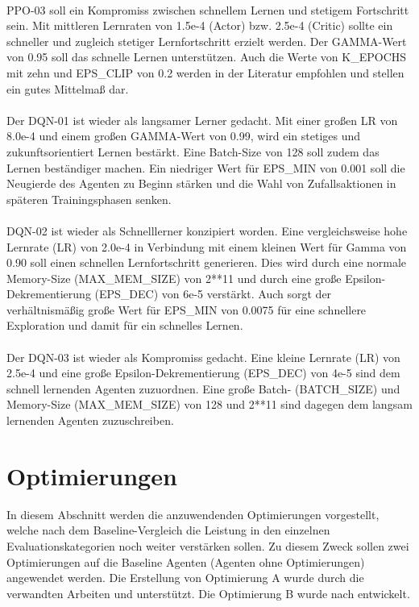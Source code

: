 \\PPO-03 soll ein Kompromiss zwischen schnellem Lernen und stetigem Fortschritt sein. Mit mittleren Lernraten von 1.5e-4 (Actor) bzw. 2.5e-4 (Critic) sollte ein schneller und zugleich stetiger Lernfortschritt erzielt werden. Der GAMMA-Wert von 0.95 soll das schnelle Lernen unterstützen. Auch die Werte von K\_EPOCHS mit zehn und EPS\_CLIP von 0.2 werden in der Literatur \cite[Anhang A]{PPO} empfohlen und stellen ein gutes Mittelmaß dar.\\
\\Der DQN-01 ist wieder als langsamer Lerner gedacht. Mit einer großen LR von 8.0e-4 und einem großen GAMMA-Wert von 0.99, wird ein stetiges und zukunftsorientiert Lernen bestärkt. Eine Batch-Size von 128 soll zudem das Lernen beständiger machen. Ein niedriger Wert für EPS\_MIN von 0.001 soll die Neugierde des Agenten zu Beginn stärken und die Wahl von Zufallsaktionen in späteren Trainingsphasen senken.\\
\\DQN-02 ist wieder als Schnelllerner konzipiert worden. Eine vergleichsweise hohe Lernrate (LR) von 2.0e-4 in Verbindung mit einem kleinen Wert für Gamma von 0.90 soll einen schnellen Lernfortschritt generieren. Dies wird durch eine normale Memory-Size (MAX\_MEM\_SIZE) von 2**11 und durch eine große Epsilon-Dekrementierung (EPS\_DEC) von 6e-5 verstärkt. Auch sorgt der verhältnismäßig große Wert für EPS\_MIN von 0.0075 für eine schnellere Exploration und damit für ein schnelles Lernen.\\
\\Der DQN-03 ist wieder als Kompromiss gedacht. Eine kleine Lernrate (LR) von \linebreak[4] 2.5e-4 und eine große Epsilon-Dekrementierung (EPS\_DEC) von 4e-5 sind dem schnell lernenden Agenten zuzuordnen. Eine große Batch- (BATCH\_SIZE) und Memory-Size (MAX\_MEM\_SIZE) von 128 und 2**11 sind dagegen dem langsam lernenden Agenten zuzuschreiben.

\section{Optimierungen} \label{sec:Konzept_Optimierungen}
In diesem Abschnitt werden die anzuwendenden Optimierungen vorgestellt, welche nach dem Baseline-Vergleich die Leistung in den einzelnen Evaluationskategorien noch weiter verstärken sollen. Zu diesem Zweck sollen zwei Optimierungen auf die Baseline Agenten (Agenten ohne Optimierungen) angewendet werden. Die Erstellung von Optimierung A wurde durch die verwandten Arbeiten \cite{UAV} und \cite{Autonomous_Agents_in_Snake_Game_via_DRL} unterstützt. Die Optimierung B wurde nach \cite[S. 331 f.]{DRL_Lapan} entwickelt.

